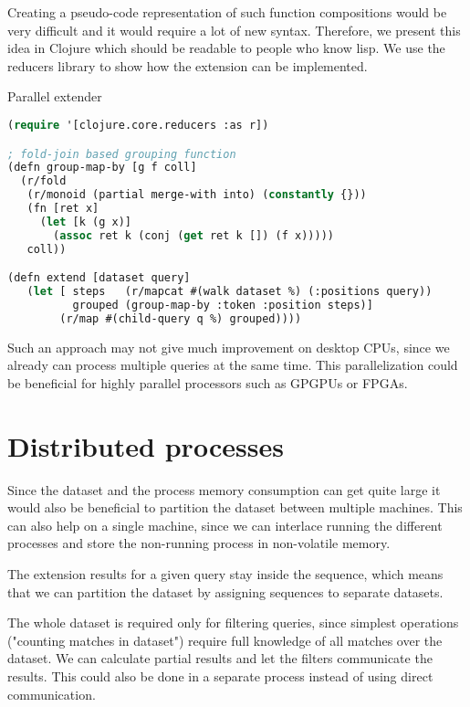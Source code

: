 Creating a pseudo-code representation of such function compositions would be very difficult and it would require a lot of new syntax. Therefore, we present this idea in Clojure\cite{clojure} which should be readable to people who know lisp. We use the reducers library to show how the extension can be implemented.

\begin{algorithm}[H]
	\caption{Parallel extender}
\begin{lstlisting}[language=Lisp]
(require '[clojure.core.reducers :as r])

; fold-join based grouping function
(defn group-map-by [g f coll]
  (r/fold 
   (r/monoid (partial merge-with into) (constantly {}))
   (fn [ret x]
     (let [k (g x)]
       (assoc ret k (conj (get ret k []) (f x)))))
   coll))

(defn extend [dataset query]
   (let [ steps   (r/mapcat #(walk dataset %) (:positions query))
          grouped (group-map-by :token :position steps)]
        (r/map #(child-query q %) grouped))))
\end{lstlisting}
\end{algorithm}

Such an approach may not give much improvement on desktop CPUs, since we already can process multiple queries at the same time. This parallelization could be beneficial for highly parallel processors such as GPGPUs or FPGAs.

\section{Distributed processes}

Since the dataset and the process memory consumption can get quite large it would also be beneficial to partition the dataset between multiple machines. This can also help on a single machine, since we can interlace running the different processes and store the non-running process in non-volatile memory.

The extension results for a given query stay inside the sequence, which means that we can partition the dataset by assigning sequences to separate datasets.

The whole dataset is required only for filtering queries, since simplest operations ("counting matches in dataset") require full knowledge of all matches over the dataset. We can calculate partial results and let the filters communicate the results. This could also be done in a separate process instead of using direct communication.

